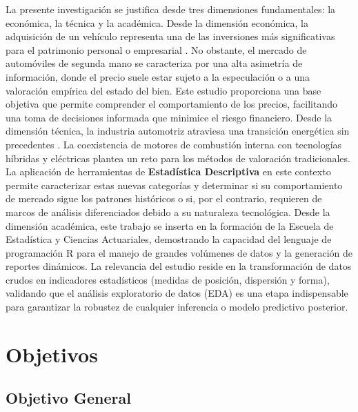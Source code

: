 \documentclass[oneside,11pt]{Latex/Classes/PhDthesisPSnPDF}
\begin{document}
La presente investigación se justifica desde tres dimensiones
fundamentales: la económica, la técnica y la académica. \newline
\newline Desde la dimensión económica, la adquisición de un vehículo
representa una de las inversiones más significativas para el patrimonio
personal o empresarial \citep{rginversiones2024}. No obstante, el
mercado de automóviles de segunda mano se caracteriza por una alta
asimetría de información, donde el precio suele estar sujeto a la
especulación o a una valoración empírica del estado del bien. Este
estudio proporciona una base objetiva que permite comprender el
comportamiento de los precios, facilitando una toma de decisiones
informada que minimice el riesgo financiero. \newline \newline Desde la
dimensión técnica, la industria automotriz atraviesa una transición
energética sin precedentes \citep{iea2025}. La coexistencia de motores
de combustión interna con tecnologías híbridas y eléctricas plantea un
reto para los métodos de valoración tradicionales. La aplicación de
herramientas de \textbf{Estadística Descriptiva} en este contexto
permite caracterizar estas nuevas categorías y determinar si su
comportamiento de mercado sigue los patrones históricos o si, por el
contrario, requieren de marcos de análisis diferenciados debido a su
naturaleza tecnológica. \newline \newline Desde la dimensión académica,
este trabajo se inserta en la formación de la Escuela de Estadística y
Ciencias Actuariales, demostrando la capacidad del lenguaje de
programación R para el manejo de grandes volúmenes de datos y la
generación de reportes dinámicos. La relevancia del estudio reside en la
transformación de datos crudos en indicadores estadísticos (medidas de
posición, dispersión y forma), validando que el análisis exploratorio de
datos (EDA) es una etapa indispensable para garantizar la robustez de
cualquier inferencia o modelo predictivo posterior.

\section{Objetivos}

\subsection{Objetivo General}
\end{document}
